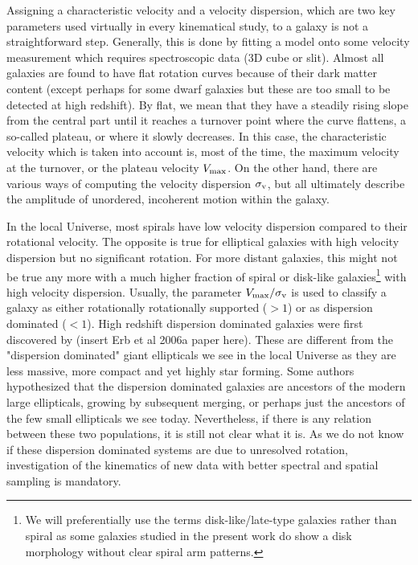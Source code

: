 Assigning a characteristic velocity and a velocity dispersion, which are two key parameters used virtually in every kinematical study, to a galaxy is not a straightforward step. Generally, this is done by fitting a model onto some velocity measurement which requires spectroscopic data (3D cube or slit). Almost all galaxies are found to have flat rotation curves because of their dark matter content (except perhaps for some dwarf galaxies but these are too small to be detected at high redshift). By flat, we mean that they have a steadily rising slope from the central part until it reaches a turnover point where the curve flattens, a so-called plateau, or where it slowly decreases. In this case, the characteristic velocity which is taken into account is, most of the time, the maximum velocity at the turnover, or the plateau velocity $V_{\rm{max}}$. On the other hand, there are various ways of computing the velocity dispersion $\sigma_{\rm{v}}$, but all ultimately describe the amplitude of unordered, incoherent motion within the galaxy.

In the local Universe, most spirals have low velocity dispersion compared to their rotational velocity. The opposite is true for elliptical galaxies with high velocity dispersion but no significant rotation. For more distant galaxies, this might not be true any more with a much higher fraction of spiral or disk-like galaxies\footnote{We will preferentially use the terms disk-like/late-type galaxies rather than spiral as some galaxies studied in the present work do show a disk morphology without clear spiral arm patterns.} with high velocity dispersion. Usually, the parameter $V_{\rm{max}} / \sigma_{\rm{v}}$ is used to classify a galaxy as either rotationally rotationally supported ($> 1$) or as dispersion dominated ($< 1$). High redshift dispersion dominated galaxies were first discovered by (insert Erb et al 2006a paper here). These are different from the "dispersion dominated" giant ellipticals we see in the local Universe as they are less massive, more compact and yet highly star forming. Some authors hypothesized that the dispersion dominated galaxies are ancestors of the modern large ellipticals, growing by subsequent merging, or perhaps just the ancestors of the few small ellipticals we see today. Nevertheless, if there is any relation between these two populations, it is still not clear what it is. As we do not know if these dispersion dominated systems are due to unresolved rotation, investigation of the kinematics of new data with better spectral and spatial sampling is mandatory.

